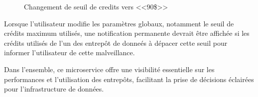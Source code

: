 \begin{itemize}
\begin{enumerate}
\begin{figure}[H]
\begin{tabular}[b]{c}
                        \end{tabular}
                        \caption{Changement de seuil de credits vers <<90\$>>                    }
                    \end{figure}
                    \par Lorsque l'utilisateur modifie les paramètres globaux, notamment le seuil de crédits maximum utilisés,
                     une notification permanente devrait être affichée si les crédits utilisés de l'un des entrepôt de donneés à dépacer cette seuil 
                     pour informer l'utilisateur de cette malveillance.
            \end{enumerate}

\end{itemize}
\par Dans l'ensemble, ce microservice offre une visibilité essentielle sur les performances et l'utilisation des entrepôts, facilitant la prise de décisions éclairées pour l'infrastructure de données.
